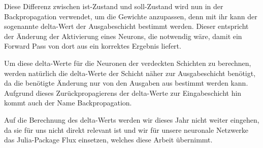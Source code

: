 \documentclass[10pt]{article}
\newcommand{\eng}[1]{\textit{#1}}
\begin{document}

        
        

Diese Differenz zwischen ist-Zustand und soll-Zustand wird nun in der Backpropagation verwendet, um die Gewichte anzupassen, denn mit ihr kann der sogenannte delta-Wert der Ausgabeschicht bestimmt werden.
Dieser entspricht der Änderung der Aktivierung eines Neurons, die notwendig wäre, damit ein Forward Pass von dort aus ein korrektes Ergebnis liefert.

Um diese delta-Werte für die Neuronen der verdeckten Schichten zu berechnen, werden natürlich die delta-Werte der Schicht näher zur Ausgabeschicht benötigt, da die benötigte Änderung nur von den Ausgaben aus bestimmt werden kann.
Aufgrund dieses Zurückpropagierens der delta-Werte zur Eingabeschicht hin kommt auch der Name Backpropagation.

Auf die Berechnung des delta-Werts werden wir dieses Jahr nicht weiter eingehen, da sie für uns nicht direkt relevant ist und wir für unsere neuronale Netzwerke das Julia-Package Flux einsetzen, welches diese Arbeit übernimmt.
\end{document}
